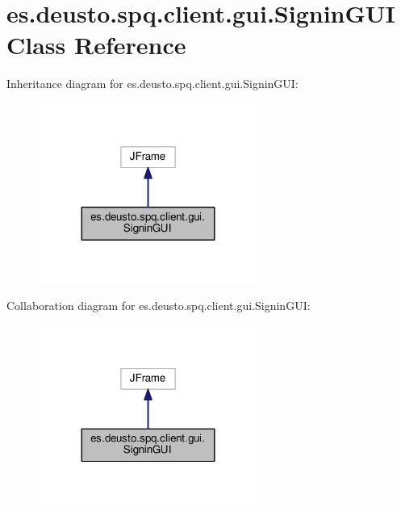 \hypertarget{classes_1_1deusto_1_1spq_1_1client_1_1gui_1_1_signin_g_u_i}{}\section{es.\+deusto.\+spq.\+client.\+gui.\+Signin\+G\+UI Class Reference}
\label{classes_1_1deusto_1_1spq_1_1client_1_1gui_1_1_signin_g_u_i}


Inheritance diagram for es.\+deusto.\+spq.\+client.\+gui.\+Signin\+G\+UI\+:\nopagebreak
\begin{figure}[H]
\begin{center}
\leavevmode
\includegraphics[width=203pt]{classes_1_1deusto_1_1spq_1_1client_1_1gui_1_1_signin_g_u_i__inherit__graph}
\end{center}
\end{figure}


Collaboration diagram for es.\+deusto.\+spq.\+client.\+gui.\+Signin\+G\+UI\+:\nopagebreak
\begin{figure}[H]
\begin{center}
\leavevmode
\includegraphics[width=203pt]{classes_1_1deusto_1_1spq_1_1client_1_1gui_1_1_signin_g_u_i__coll__graph}
\end{center}
\end{figure}
